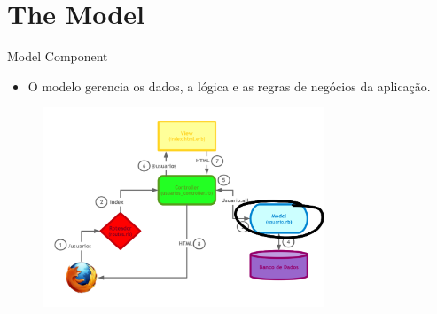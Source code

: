 \section{The Model}
\begin{frame}[t, fragile]{Model Component}
	\begin{itemize}
		\item O modelo gerencia os \alert{dados}, a \alert{lógica} e as \alert{regras de negócios} da aplicação.
	\end{itemize}
	\begin{figure}[h!]
		\centering
		\includegraphics[width=0.75\textwidth]{imagens/mvc-2.png}
	\end{figure}
\end{frame}